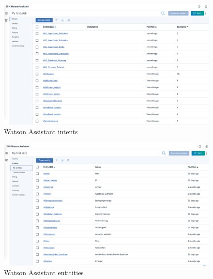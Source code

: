 \begin{figure}[h]
	\centering
	\includegraphics[width=1\textwidth]{images/WA_intents.png}
	\caption{Watson Assistant intents}
	\label{wa_intents}
\end{figure}

\begin{figure}[h]
	\centering
	\includegraphics[width=1\textwidth]{images/WA_entities.png}
	\caption{Watson Assistant entitities}
	\label{wa_entities}
\end{figure}

